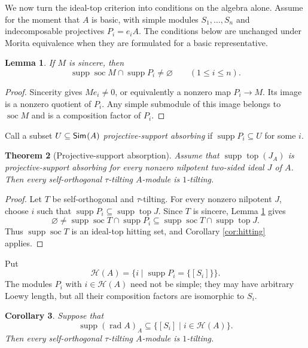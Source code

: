 \documentclass[a4paper,reqno]{amsart}
\newtheorem{theorem}{Theorem}[section]
\newtheorem{corollary}[theorem]{Corollary}
\newtheorem{lemma}[theorem]{Lemma}
\theoremstyle{definition}
\newcommand{\rad}{\operatorname{rad}\nolimits}
\newcommand{\soc}{\operatorname{soc}\nolimits}
\newcommand{\topm}{\operatorname{top}\nolimits}
\newcommand{\supp}{\operatorname{supp}\nolimits}
\newcommand{\Sim}{\mathsf{Sim}\hspace{.01in}}
\numberwithin{equation}{section}
\begin{document}
We now turn the ideal-top criterion into conditions on the algebra
alone. Assume for the moment that $A$ is basic, with simple modules
$S_1,\dots,S_n$ and indecomposable projectives $P_i=e_iA$.
The conditions below are unchanged under Morita equivalence when they
are formulated for a basic representative.

\begin{lemma}
\label{lem:projective-support-transversal}
If $M$ is sincere, then
\[
            \supp\soc M\cap\supp P_i\neq\varnothing
            \qquad(1\leq i\leq n).
\]
\end{lemma}

\begin{proof}
Sincerity gives $Me_i\neq0$, or equivalently a nonzero map
$P_i\to M$.  Its image is a nonzero quotient of $P_i$. Any simple
submodule of this image belongs to $\soc M$ and is a composition
factor of $P_i$.
\end{proof}

Call a subset $U\subseteq\Sim(A)$ \emph{projective-support
absorbing} if $\supp P_i\subseteq U$ for some $i$.

\begin{theorem}[Projective-support absorption]
\label{thm:projective-support-absorption}
Assume that $\supp\topm(J_A)$ is projective-support absorbing for
every nonzero nilpotent two-sided ideal $J$ of $A$. Then every
self-orthogonal $\tau$-tilting $A$-module is $1$-tilting.
\end{theorem}

\begin{proof}
Let $T$ be self-orthogonal and $\tau$-tilting. For every nonzero
nilpotent $J$, choose $i$ such that
$\supp P_i\subseteq\supp\topm J$. Since $T$ is sincere, Lemma
\ref{lem:projective-support-transversal} gives
\[
 \varnothing\neq\supp\soc T\cap\supp P_i
 \subseteq\supp\soc T\cap\supp\topm J.
\]
Thus $\supp\soc T$ is an ideal-top hitting set, and Corollary
\ref{cor:hitting} applies.
\end{proof}

Put
\[
 \mathcal H(A)=
 \{i\mid\supp P_i=\{[S_i]\}\}.
\]
The modules $P_i$ with $i\in\mathcal H(A)$ need not be simple; they
may have arbitrary Loewy length, but all their composition factors
are isomorphic to $S_i$.

\begin{corollary}
\label{cor:homogeneous-radical}
Suppose that
\begin{equation}\label{eq:homogeneous-radical}
 \supp(\rad A)_A\subseteq
 \{[S_i]\mid i\in\mathcal H(A)\}.
\end{equation}
Then every self-orthogonal $\tau$-tilting $A$-module is
$1$-tilting.
\end{corollary}
\end{document}

